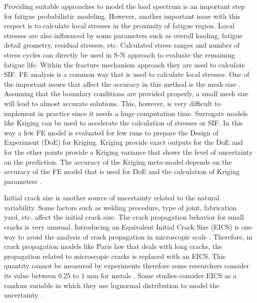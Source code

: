 Providing suitable approaches to model the load spectrum is an important step for fatigue probabilistic modeling. However, another important issue with this respect is to calculate local stresses in the 
proximity of fatigue region. Local stresses are also influenced by some parameters such as overall loading, fatigue detail geometry, residual stresses, etc. Calculated stress ranges and number of 
stress cycles can directly be used in S-N approach to evaluate the remaining fatigue life. Within the fracture mechanism approach they are used to calculate SIF. FE analysis is a common way that
is used to calculate local stresses. One of the important issues that affect the accuracy in this method is the mesh size \citep{SANKARARAMAN2011}. Assuming that the boundary conditions are provided 
properly, a small mesh 
size will lead to almost accurate solutions. This, however, is very difficult to implement in practice since it needs a huge computation time. Surrogate models like Kriging can be used to accelerate
the calculation of stresses or SIF. In this way a few FE model is evaluated for few runs to prepare the Design of Experiment (DoE) for Kriging. Kriging provide exact outputs for the DoE and for the 
other points provide a Kriging variance that shows the level of uncertainty on the prediction. The accuracy of the Kriging meta-model depends on the accuracy of the FE model that is used for DoE and
the calculation of Kriging parameters \citep{SANKARARAMAN2011}. 

Initial crack size is another source of uncertainty related to the natural variability. Some factors such as welding procedure, type of joint, fabrication yard, etc. affect the initial crack size. 
The crack propagation behavior for small cracks is very unusual. Introducing an Equivalent Initial Crack Size (EICS) is one way to avoid the analysis of crack propagation in microscopic scale 
\citep{Sankararaman2009, LIU2009476}. Therefore, in crack propagation models like Paris law that deals with long cracks, the propagation related to microscopic cracks is replaced with an EICS. This quantity 
cannot be measured by experiments therefore some researchers consider its value between 0.25 to 1 mm for metals \citep{MERATI2007673, gallagher1984usaf}. Some studies consider EICS as a random
variable in which they use lognormal distribution to model the uncertainty \citep{Wirsching1984}. 

